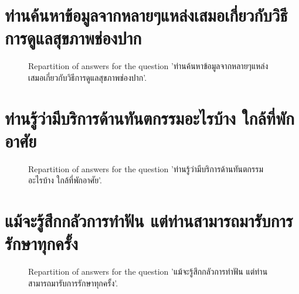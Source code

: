 \documentclass[12pt]{article}
\begin{document}
\clearpage{}
\section{ท่านค้นหาข้อมูลจากหลายๆแหล่งเสมอเกี่ยวกับวิธีการดูแลสุขภาพช่องปาก}

\label{sec:123}


\begin{figure}[h!]
    \caption{\label{figure:q123-1}Repartition of answers for the question 'ท่านค้นหาข้อมูลจากหลายๆแหล่งเสมอเกี่ยวกับวิธีการดูแลสุขภาพช่องปาก'.}
\end{figure}



\clearpage{}
\section{ท่านรู้ว่ามีบริการด้านทันตกรรมอะไรบ้าง ใกล้ที่พักอาศัย}

\label{sec:124}


\begin{figure}[h!]
    \caption{\label{figure:q124-1}Repartition of answers for the question 'ท่านรู้ว่ามีบริการด้านทันตกรรมอะไรบ้าง ใกล้ที่พักอาศัย'.}
\end{figure}



\clearpage{}
\section{แม้จะรู้สึกกลัวการทำฟัน แต่ท่านสามารถมารับการรักษาทุกครั้ง}

\label{sec:125}


\begin{figure}[h!]
    \caption{\label{figure:q125-1}Repartition of answers for the question 'แม้จะรู้สึกกลัวการทำฟัน แต่ท่านสามารถมารับการรักษาทุกครั้ง'.}
\end{figure}
\end{document}
